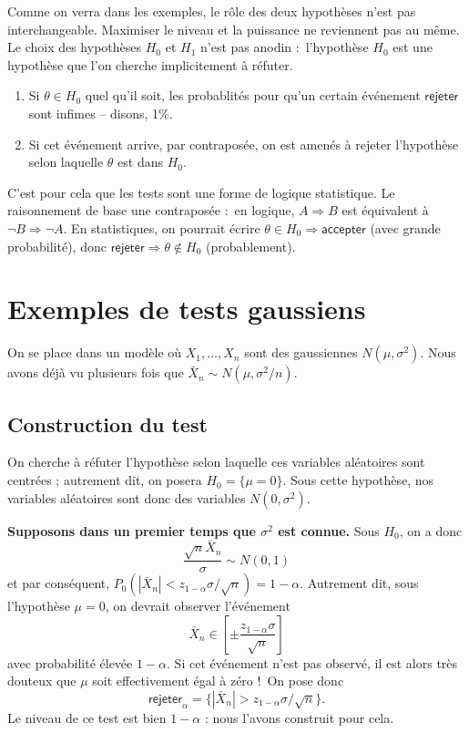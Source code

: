 \documentclass[
  10,
  letterpaper,
  DIV=11,
  numbers=noendperiod]{scrreport}
\providecommand{\tightlist}{%
  \setlength{\itemsep}{0pt}\setlength{\parskip}{0pt}}\usepackage{longtable,booktabs,array}
\theoremstyle{plain}
\theoremstyle{definition}
\theoremstyle{plain}
\theoremstyle{definition}
\theoremstyle{definition}
\theoremstyle{plain}
\theoremstyle{remark}
\begin{document}
Comme on verra dans les exemples, le rôle des deux hypothèses n'est pas
interchangeable. Maximiser le niveau et la puissance ne reviennent pas
au même. Le choix des hypothèses \(H_0\) et \(H_1\) n'est pas anodin
:~l'hypothèse \(H_0\) est une hypothèse que l'on cherche implicitement à
réfuter.

\begin{enumerate}
\def\labelenumi{\arabic{enumi}.}
\tightlist
\item
  Si \(\theta \in H_0\) quel qu'il soit, les probablités pour qu'un
  certain événement \(\mathsf{rejeter}\) sont infimes -- disons, 1\%.
\item
  Si cet événement arrive, par contraposée, on est amenés à rejeter
  l'hypothèse selon laquelle \(\theta\) est dans \(H_0\).
\end{enumerate}

C'est pour cela que les tests sont une forme de logique statistique. Le
raisonnement de base une contraposée :~en logique, \(A \Rightarrow B\)
est équivalent à \(\neg B \Rightarrow \neg A\). En statistiques, on
pourrait écrire \(\theta \in H_0 \Rightarrow \mathsf{accepter}\) (avec
grande probabilité), donc
\(\mathsf{rejeter}\Rightarrow \theta \notin H_0\) (probablement).

\hypertarget{exemples-de-tests-gaussiens}{%
\section{Exemples de tests
gaussiens}\label{exemples-de-tests-gaussiens}}

On se place dans un modèle où \(X_1, \dotsc, X_n\) sont des gaussiennes
\(N(\mu, \sigma^2)\). Nous avons déjà vu plusieurs fois que
\(\bar{X}_n \sim N(\mu, \sigma^2/n)\).

\hypertarget{construction-du-test}{%
\subsection{Construction du test}\label{construction-du-test}}

On cherche à réfuter l'hypothèse selon laquelle ces variables aléatoires
sont centrées ; autrement dit, on posera \(H_0 = \{\mu=0\}\). Sous cette
hypothèse, nos variables aléatoires sont donc des variables
\(N(0,\sigma^2)\).

\textbf{Supposons dans un premier temps que \(\sigma^2\) est connue.}
Sous \(H_0\), on a donc
\[ \frac{\sqrt{n}\bar{X}_n}{\sigma} \sim N(0,1)\] et par conséquent,
\(P_0(|\bar{X}_n| < z_{1-\alpha} \sigma / \sqrt{n}) = 1-\alpha\).
Autrement dit, sous l'hypothèse \(\mu = 0\), on devrait observer
l'événement
\[ \bar{X}_n \in \left[ \pm \frac{z_{1-\alpha} \sigma}{\sqrt{n}}\right]\]
avec probabilité élevée \(1-\alpha\). Si cet événement n'est pas
observé, il est alors très douteux que \(\mu\) soit effectivement égal à
zéro !~On pose donc
\[ \mathsf{rejeter}_\alpha = \{|\bar{X}_n | > z_{1-\alpha} \sigma / \sqrt{n}\}.\]
Le niveau de ce test est bien \(1-\alpha\) : nous l'avons construit pour
cela.
\end{document}
